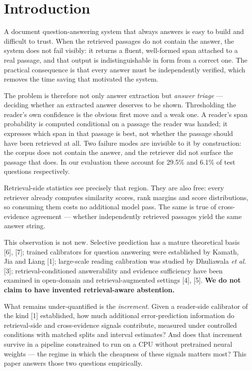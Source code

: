 \documentclass[conference]{IEEEtran}
\begin{document}
\section{Introduction}

A document question-answering system that always answers is easy to build and difficult to trust. When the retrieved passages do not contain the answer, the system does not fail visibly: it returns a fluent, well-formed span attached to a real passage, and that output is indistinguishable in form from a correct one. The practical consequence is that every answer must be independently verified, which removes the time saving that motivated the system.

The problem is therefore not only answer extraction but \emph{answer triage} --- deciding whether an extracted answer deserves to be shown. Thresholding the reader's own confidence is the obvious first move and a weak one. A reader's span probability is computed conditional on a passage the reader was handed; it expresses which span in that passage is best, not whether the passage should have been retrieved at all. Two failure modes are invisible to it by construction: the corpus does not contain the answer, and the retriever did not surface the passage that does. In our evaluation these account for 29.5\% and 6.1\% of test questions respectively.

Retrieval-side statistics see precisely that region. They are also free: every retriever already computes similarity scores, rank margins and score distributions, so consuming them costs no additional model pass. The same is true of cross-evidence agreement --- whether independently retrieved passages yield the same answer string.

This observation is not new. Selective prediction has a mature theoretical basis [6], [7]; trained calibrators for question answering were established by Kamath, Jia and Liang [1]; large-scale reading calibration was studied by Dhuliawala \emph{et al.} [3]; retrieval-conditioned answerability and evidence sufficiency have been examined in open-domain and retrieval-augmented settings [4], [5]. \textbf{We do not claim to have invented retrieval-aware abstention.}

What remains under-quantified is the \emph{increment}. Given a reader-side calibrator of the kind [1] established, how much additional error-prediction information do retrieval-side and cross-evidence signals contribute, measured under controlled conditions with matched splits and interval estimates? And does that increment survive in a pipeline constrained to run on a CPU without pretrained neural weights --- the regime in which the cheapness of these signals matters most? This paper answers those two questions empirically.
\end{document}
